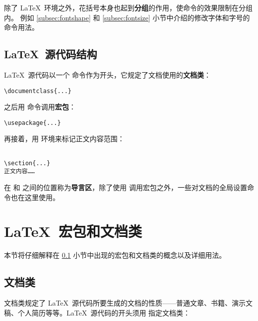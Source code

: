 除了 \LaTeX\ 环境之外，花括号本身也起到\textbf{分组}的作用，使命令的效果限制在分组内。
例如 \ref{subsec:fontshape} 和 \ref{subsec:fontsize} 小节中介绍的修改字体和字号的命令用法。

\subsection{\LaTeX\ 源代码结构}\label{subsec:struct}

\LaTeX\ 源代码以一个  命令作为开头，它规定了文档使用的\textbf{文档类}：
\begin{verbatim}
\documentclass{...}
\end{verbatim}

之后用  命令调用\textbf{宏包}：
\begin{verbatim}
\usepackage{...}
\end{verbatim}

再接着，用  环境来标记正文内容范围：
\begin{verbatim}

\section{...}
正文内容……

\end{verbatim}

在  和  之间的位置称为\textbf{导言区}，除了使用 
调用宏包之外，一些对文档的全局设置命令也在这里使用。

\section{\LaTeX\ 宏包和文档类}\label{sec:latex-pkgs}

本节将仔细解释在 \ref{subsec:struct} 小节中出现的宏包和文档类的概念以及详细用法。

\subsection{文档类}\label{subsec:classes}

文档类规定了 \LaTeX\ 源代码所要生成的文档的性质——普通文章、书籍、演示文稿、个人简历等等。\LaTeX\ 源代码的开头须用
指定文档类：
\begin{command}
\end{command}

